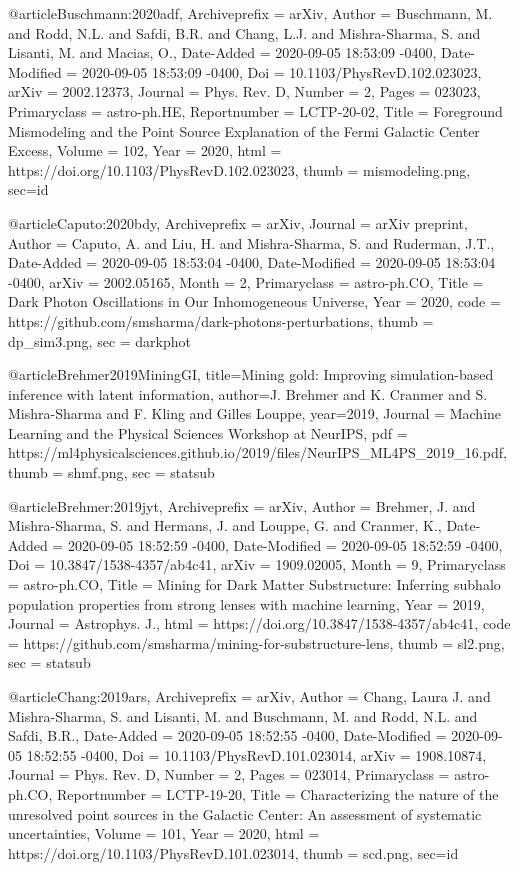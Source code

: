 @article{Buschmann:2020adf,
	Archiveprefix = {arXiv},
	Author = {Buschmann, M. and Rodd, N.L. and Safdi, B.R. and Chang, L.J. and Mishra-Sharma, S. and Lisanti, M. and Macias, O.},
	Date-Added = {2020-09-05 18:53:09 -0400},
	Date-Modified = {2020-09-05 18:53:09 -0400},
	Doi = {10.1103/PhysRevD.102.023023},
	arXiv = {2002.12373},
	Journal = {Phys. Rev. D},
	Number = {2},
	Pages = {023023},
	Primaryclass = {astro-ph.HE},
	Reportnumber = {LCTP-20-02},
	Title = {{Foreground Mismodeling and the Point Source Explanation of the Fermi Galactic Center Excess}},
	Volume = {102},
	Year = {2020},
	html = {https://doi.org/10.1103/PhysRevD.102.023023},
	thumb = {mismodeling.png},
	sec={id}}

@article{Caputo:2020bdy,
	Archiveprefix = {arXiv},
	Journal = {arXiv preprint},
	Author = {Caputo, A. and Liu, H. and Mishra-Sharma, S. and Ruderman, J.T.},
	Date-Added = {2020-09-05 18:53:04 -0400},
	Date-Modified = {2020-09-05 18:53:04 -0400},
	arXiv = {2002.05165},
	Month = {2},
	Primaryclass = {astro-ph.CO},
	Title = {{Dark Photon Oscillations in Our Inhomogeneous Universe}},
	Year = {2020},
	code = {https://github.com/smsharma/dark-photons-perturbations},
	thumb = {dp_sim3.png},
	sec = {darkphot}}

@article{Brehmer2019MiningGI,
	title={Mining gold: Improving simulation-based inference with latent information},
	author={J. Brehmer and K. Cranmer and S. Mishra-Sharma and F. Kling and Gilles Louppe},
	year={2019},
	Journal = {Machine Learning and the Physical Sciences Workshop at NeurIPS},
	pdf = {https://ml4physicalsciences.github.io/2019/files/NeurIPS_ML4PS_2019_16.pdf},
	thumb = {shmf.png},
	sec = {statsub}
}

@article{Brehmer:2019jyt,
	Archiveprefix = {arXiv},
	Author = {Brehmer, J. and Mishra-Sharma, S. and Hermans, J. and Louppe, G. and Cranmer, K.},
	Date-Added = {2020-09-05 18:52:59 -0400},
	Date-Modified = {2020-09-05 18:52:59 -0400},
	Doi = {10.3847/1538-4357/ab4c41},
	arXiv = {1909.02005},
	Month = {9},
	Primaryclass = {astro-ph.CO},
	Title = {{Mining for Dark Matter Substructure: Inferring subhalo population properties from strong lenses with machine learning}},
	Year = {2019},
	Journal = {Astrophys. J.},
	html = {https://doi.org/10.3847/1538-4357/ab4c41},
	code = {https://github.com/smsharma/mining-for-substructure-lens},
	thumb = {sl2.png},
	sec = {statsub}}

@article{Chang:2019ars,
	Archiveprefix = {arXiv},
	Author = {Chang, Laura J. and Mishra-Sharma, S. and Lisanti, M. and Buschmann, M. and Rodd, N.L. and Safdi, B.R.},
	Date-Added = {2020-09-05 18:52:55 -0400},
	Date-Modified = {2020-09-05 18:52:55 -0400},
	Doi = {10.1103/PhysRevD.101.023014},
	arXiv = {1908.10874},
	Journal = {Phys. Rev. D},
	Number = {2},
	Pages = {023014},
	Primaryclass = {astro-ph.CO},
	Reportnumber = {LCTP-19-20},
	Title = {{Characterizing the nature of the unresolved point sources in the Galactic Center: An assessment of systematic uncertainties}},
	Volume = {101},
	Year = {2020},
	html = {https://doi.org/10.1103/PhysRevD.101.023014},
	thumb = {scd.png},
	sec={id}}

